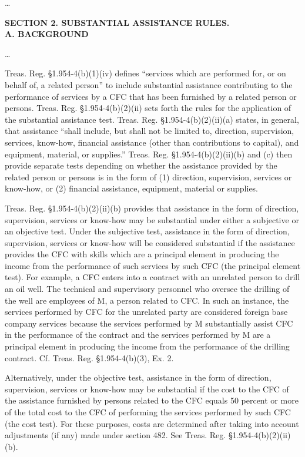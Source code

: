 \begin{select}
\ldots\\
\begin{center} \textbf{SECTION 2.  SUBSTANTIAL ASSISTANCE RULES.}\\
\textbf{A. BACKGROUND}
\end{center} \ldots 

Treas. Reg. \S 1.954-4(b)(1)(iv) defines ``services which are performed for, or on behalf of, a related person'' to include substantial assistance contributing to the performance of services by a CFC that has been furnished by a related person or persons. Treas. Reg. \S 1.954-4(b)(2)(ii) sets forth the rules for the application of the substantial assistance test. Treas. Reg. \S 1.954-4(b)(2)(ii)(a) states, in general, that assistance ``shall include, but shall not be limited to, direction, supervision, services, know-how, financial assistance (other than contributions to capital), and equipment, material, or supplies.'' Treas. Reg. \S 1.954-4(b)(2)(ii)(b) and (c) then provide separate tests depending on whether the assistance provided by the related person or persons is in the form of (1) direction, supervision, services or know-how, or (2) financial assistance, equipment, material or supplies.

Treas. Reg. \S 1.954-4(b)(2)(ii)(b) provides that assistance in the form of direction, supervision, services or know-how may be substantial under either a subjective or an objective test. Under the subjective test, assistance in the form of direction, supervision, services or know-how will be considered substantial if the assistance provides the CFC with skills which are a principal element in producing the income from the performance of such services by such CFC (the principal element test). For example, a CFC enters into a contract with an unrelated person to drill an oil well. The technical and supervisory personnel who oversee the drilling of the well are employees of M, a person related to CFC. In such an instance, the services performed by CFC for the unrelated party are considered foreign base company services because the services performed by M substantially assist CFC in the performance of the contract and the services performed by M are a principal element in producing the income from the performance of the drilling contract. Cf. Treas. Reg. \S 1.954-4(b)(3), Ex. 2.

Alternatively, under the objective test, assistance in the form of direction, supervision, services or know-how may be substantial if the cost to the CFC of the assistance furnished by persons related to the CFC equals 50 percent or more of the total cost to the CFC of performing the services performed by such CFC (the cost test). For these purposes, costs are determined after taking into account adjustments (if any) made under section 482. See Treas. Reg. \S 1.954-4(b)(2)(ii)(b).


\end{select}
